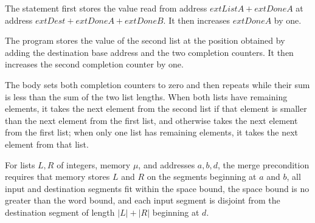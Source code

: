 \begin{definition}
\label{Light.mergeTakeLeft}
\leanok
{}
The statement first stores the value read from address $	ext{ListA}+	ext{DoneA}$ at
address $	ext{Dest}+	ext{DoneA}+	ext{DoneB}$. It then increases $	ext{DoneA}$ by one.
\end{definition}

\begin{definition}
\label{Light.mergeTakeRight}
\leanok
{}
The program stores the value of the second list at the position obtained by adding the
destination base address and the two completion counters. It then increases the second
completion counter by one.
\end{definition}

\begin{definition}
\label{Light.mergeBody}
\leanok
{}
The body sets both completion counters to zero and then repeats while their sum is less
than the sum of the two list lengths. When both lists have remaining elements, it takes
the next element from the second list if that element is smaller than the next element
from the first list, and otherwise takes the next element from the first list; when only
one list has remaining elements, it takes the next element from that list.
\end{definition}

\begin{definition}
\label{Light.Merge.Pre}
\leanok
{}
For lists $L,R$ of integers, memory $\mu$, and addresses $a,b,d$, the merge precondition
requires that memory stores $L$ and $R$ on the segments beginning at $a$ and $b$, all
input and destination segments fit within the space bound, the space bound is no greater
than the word bound, and each input segment is disjoint from the destination segment of
length $|L|+|R|$ beginning at $d$.
\end{definition}

